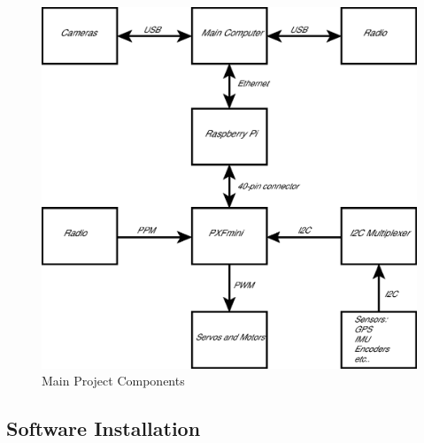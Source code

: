 \documentclass[compsoc,draftclsnofoot,onecolumn,10pt]{IEEEtran}
\begin{document}
\begin{figure}[h]
    \centering
    \includegraphics[scale=.5]{Block_Diagram}
    \caption{Main Project Components}
    \label{fig:my_label}
\end{figure}

\subsection{Software Installation}
\end{document}
